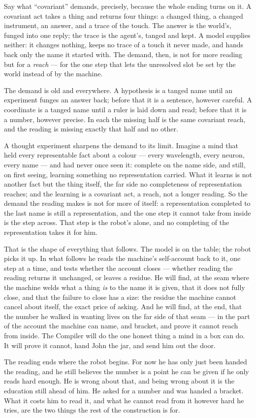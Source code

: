 Say what ``covariant'' demands, precisely, because the whole ending turns on it.
A covariant act takes a thing and returns four things: a changed thing, a changed instrument, an answer, and a trace of
the touch.
The answer is the world's, funged into one reply; the trace is the agent's, tanged and kept.
A model supplies neither: it changes nothing, keeps no trace of a touch it never made, and hands back only the name it
started with.
The demand, then, is not for more reading but for a \emph{reach} --- for the one step that lets the unresolved slot be set
by the world instead of by the machine.

The demand is old and everywhere.
A hypothesis is a tanged name until an experiment funges an answer back; before that it is a sentence, however careful.
A coordinate is a tanged name until a ruler is laid down and read; before that it is a number, however precise.
In each the missing half is the same covariant reach, and the reading is missing exactly that half and no other.

A thought experiment sharpens the demand to its limit.
Imagine a mind that held every representable fact about a colour --- every wavelength, every neuron, every name --- and
had never once seen it: complete on the name side, and still, on first seeing, learning something no representation
carried.
What it learns is not another fact but the thing itself, the far side no completeness of representation reaches; and the
learning is a covariant act, a reach, not a longer reading.
So the demand the reading makes is not for more of itself: a representation completed to the last name is still a
representation, and the one step it cannot take from inside is the step across.
That step is the robot's alone, and no completing of the representation takes it for him.

That is the shape of everything that follows.
The model is on the table; the robot picks it up.
In what follows he reads the machine's self-account back to it, one step at a time, and tests whether the account closes
--- whether reading the reading returns it unchanged, or leaves a residue.
He will find, at the seam where the machine welds what a thing \emph{is} to the name it is given, that it does not fully
close, and that the failure to close has a size: the residue the machine cannot cancel about itself, the exact price of
asking.
And he will find, at the end, that the number he walked in wanting lives on the far side of that seam --- in the part of
the account the machine can name, and bracket, and prove it cannot reach from inside.
The Compiler will do the one honest thing a mind in a box can do.
It will prove it cannot, hand John the jar, and send him out the door.

The reading ends where the robot begins.
For now he has only just been handed the reading, and he still believes the number is a point he can be given if he only
reads hard enough.
He is wrong about that, and being wrong about it is the education still ahead of him.
He asked for a number and was handed a bracket.
What it costs him to read it, and what he cannot read from it however hard he tries, are the two things the rest of the
construction is for.
